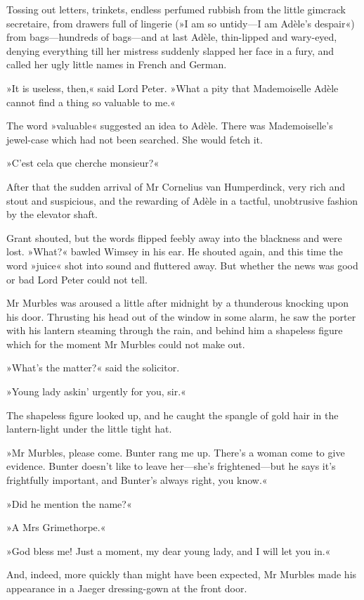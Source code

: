 Tossing out letters, trinkets, endless perfumed rubbish from the little gimcrack secretaire, from drawers full of lingerie (»I am so untidy—I am Adèle's despair«) from bags—hundreds of bags—and at last Adèle, thin-lipped and wary-eyed, denying everything till her mistress suddenly slapped her face in a fury, and called her ugly little names in French and German.

»It is useless, then,« said Lord Peter. »What a pity that Mademoiselle Adèle cannot find a thing so valuable to me.«

The word »valuable« suggested an idea to Adèle. There was Mademoiselle's jewel-case which had not been searched. She would fetch it.

»C'est cela que cherche monsieur?«

After that the sudden arrival of Mr Cornelius van Humperdinck, very rich and stout and suspicious, and the rewarding of Adèle in a tactful, unobtrusive fashion by the elevator shaft.

Grant shouted, but the words flipped feebly away into the blackness and were lost. »What?« bawled Wimsey in his ear. He shouted again, and this time the word »juice« shot into sound and fluttered away. But whether the news was good or bad Lord Peter could not tell.

Mr Murbles was aroused a little after midnight by a thunderous knocking upon his door. Thrusting his head out of the window in some alarm, he saw the porter with his lantern steaming through the rain, and behind him a shapeless figure which for the moment Mr Murbles could not make out.

»What's the matter?« said the solicitor.

»Young lady askin' urgently for you, sir.«

The shapeless figure looked up, and he caught the spangle of gold hair in the lantern-light under the little tight hat.

»Mr Murbles, please come. Bunter rang me up. There's a woman come to give evidence. Bunter doesn't like to leave her—she's frightened—but he says it's frightfully important, and Bunter's always right, you know.«

»Did he mention the name?«

»A Mrs Grimethorpe.«

»God bless me! Just a moment, my dear young lady, and I will let you in.«

And, indeed, more quickly than might have been expected, Mr Murbles made his appearance in a Jaeger dressing-gown at the front door.

